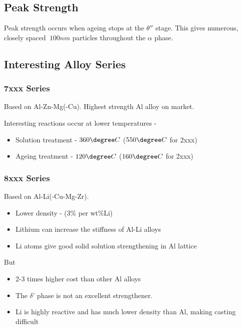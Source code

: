 
\subsection{Peak Strength} %
\label{sub:peak_strength}

Peak strength occurs when ageing stops at the $\theta''$ stage. This gives numerous, closely spaced $~100nm$ particles throughout the $\alpha$ phase.



\subsection{Interesting Alloy Series} %
\label{sub:interesting_alloy_series}

\subsubsection{7xxx Series} %
\label{ssub:7xxx_series}

Based on Al-Zn-Mg(-Cu). Highest strength Al alloy on market.

Interesting reactions occur at lower temperatures - 
\begin{itemize}
  \item Solution treatment - $360\degree C$ ($550\degree C$ for 2xxx)
  \item Ageing treatment - $120\degree C$ ($160\degree C$ for 2xxx)
\end{itemize}


\subsubsection{8xxx Series} %
\label{ssub:8xxx_series}

Based on Al-Li(-Cu-Mg-Zr).
\begin{itemize}
  \item Lower density - (3\% per wt\%Li)
  \item Lithium can increase the stiffness of Al-Li alloys 
  \item Li atoms give good solid solution strengthening in Al lattice
\end{itemize}
But
\begin{itemize}
  \item 2-3 times higher cost than other Al alloys
  \item The $\delta’$ phase is not an excellent strengthener.
  \item Li is highly reactive and has much lower density than Al, making casting difficult
\end{itemize}


